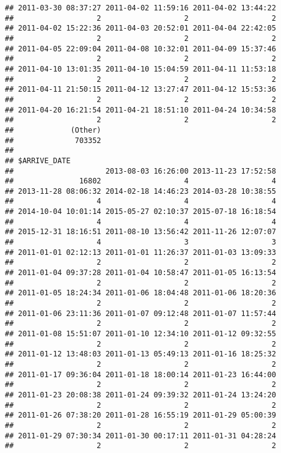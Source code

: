 \documentclass[]{article}
\begin{document}
\begin{verbatim}
## 2011-03-30 08:37:27 2011-04-02 11:59:16 2011-04-02 13:44:22 
##                   2                   2                   2 
## 2011-04-02 15:22:36 2011-04-03 20:52:01 2011-04-04 22:42:05 
##                   2                   2                   2 
## 2011-04-05 22:09:04 2011-04-08 10:32:01 2011-04-09 15:37:46 
##                   2                   2                   2 
## 2011-04-10 13:01:35 2011-04-10 15:04:59 2011-04-11 11:53:18 
##                   2                   2                   2 
## 2011-04-11 21:50:15 2011-04-12 13:27:47 2011-04-12 15:53:36 
##                   2                   2                   2 
## 2011-04-20 16:21:54 2011-04-21 18:51:10 2011-04-24 10:34:58 
##                   2                   2                   2 
##             (Other) 
##              703352 
## 
## $ARRIVE_DATE
##                     2013-08-03 16:26:00 2013-11-23 17:52:58 
##               16802                   4                   4 
## 2013-11-28 08:06:32 2014-02-18 14:46:23 2014-03-28 10:38:55 
##                   4                   4                   4 
## 2014-10-04 10:01:14 2015-05-27 02:10:37 2015-07-18 16:18:54 
##                   4                   4                   4 
## 2015-12-31 18:16:51 2011-08-10 13:56:42 2011-11-26 12:07:07 
##                   4                   3                   3 
## 2011-01-01 02:12:13 2011-01-01 11:26:37 2011-01-03 13:09:33 
##                   2                   2                   2 
## 2011-01-04 09:37:28 2011-01-04 10:58:47 2011-01-05 16:13:54 
##                   2                   2                   2 
## 2011-01-05 18:24:34 2011-01-06 18:04:48 2011-01-06 18:20:36 
##                   2                   2                   2 
## 2011-01-06 23:11:36 2011-01-07 09:12:48 2011-01-07 11:57:44 
##                   2                   2                   2 
## 2011-01-08 15:51:07 2011-01-10 12:34:10 2011-01-12 09:32:55 
##                   2                   2                   2 
## 2011-01-12 13:48:03 2011-01-13 05:49:13 2011-01-16 18:25:32 
##                   2                   2                   2 
## 2011-01-17 09:36:04 2011-01-18 18:00:14 2011-01-23 16:44:00 
##                   2                   2                   2 
## 2011-01-23 20:08:38 2011-01-24 09:39:32 2011-01-24 13:24:20 
##                   2                   2                   2 
## 2011-01-26 07:38:20 2011-01-28 16:55:19 2011-01-29 05:00:39 
##                   2                   2                   2 
## 2011-01-29 07:30:34 2011-01-30 00:17:11 2011-01-31 04:28:24 
##                   2                   2                   2 

\end{verbatim}
\end{document}
